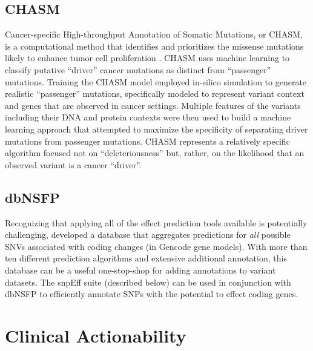 \documentclass{article}
\begin{document}
\subsection{CHASM}

Cancer-specific High-throughput Annotation of Somatic Mutations, or
CHASM, is a computational method that identifies and prioritizes the
missense mutations likely to enhance tumor cell proliferation
\parencite{Carter2009-ci}. CHASM uses machine learning to classify putative
``driver'' cancer mutations as distinct from ``passenger''
mutations. Training the CHASM model employed in-silico simulation to
generate realistic ``passenger'' mutations, specifically modeled to
represent variant context and genes that are observed in cancer
settings. Multiple features of the variants including their DNA and protein
contexts were then used to build a machine learning approach that
attempted to maximize the specificity of separating driver mutations
from passenger mutations. CHASM represents a relatively specific
algorithm focused not on ``deleteriousness'' but, rather, on the
likelihood that an observed variant is a cancer ``driver''.


\subsection{dbNSFP}

Recognizing that applying all of the effect prediction tools available
is potentially challenging, \cite{Liu2016-iv} developed a database
that aggregates predictions for \textit{all} possible SNVs associated
with coding changes (in Gencode gene models). With more than ten
different prediction algorithms and extensive additional annotation,
this database can be a useful one-stop-shop for adding annotations to
variant datasets. The snpEff suite (described below) can be used in
conjunction with dbNSFP to efficiently annotate SNPs with the
potential to effect coding genes.

\section{Clinical Actionability}
\end{document}
